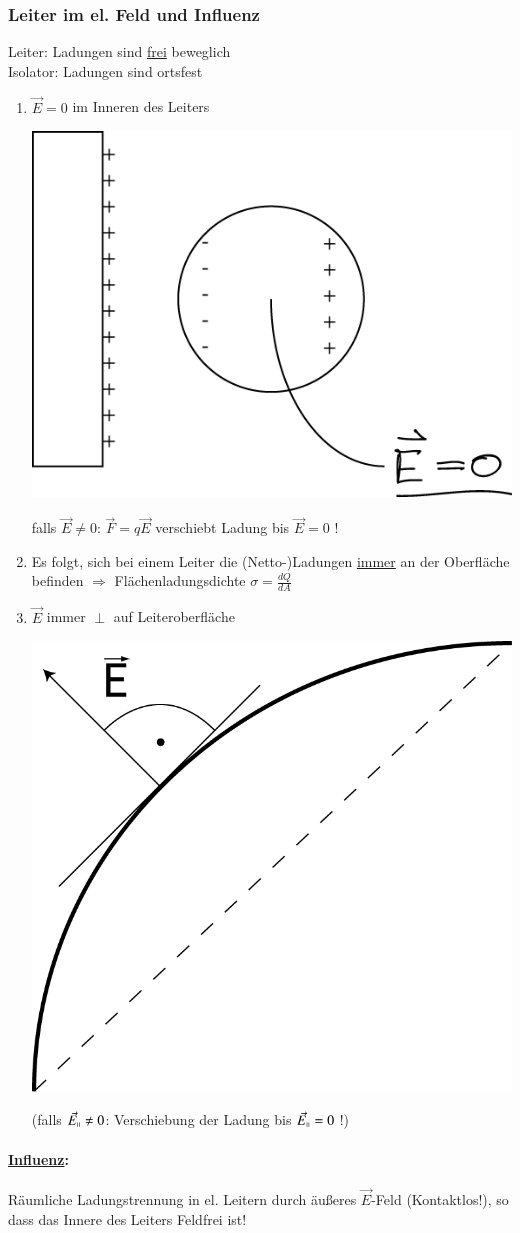 \documentclass[11pt]{article}
\begin{document}
	\subsubsection{Leiter im el. Feld und Influenz}
	Leiter: Ladungen sind \underline{frei} beweglich  \\
	Isolator: Ladungen sind ortsfest
	\begin{enumerate}
		\item $ \vec{E} = 0 $ im Inneren des Leiters 
		\begin{center}
			\includegraphics[width=0.4\linewidth]{skizzen/14/14_4B6}
		\end{center} 
		falls $ \vec{E} \neq 0 $: $ \vec{F} = q\vec{E} $ verschiebt Ladung bis $ \vec{E} = 0 $ ! 
		\item Es folgt, sich bei einem Leiter die (Netto-)Ladungen \underline{immer} an der Oberfläche befinden $ \Rightarrow $ Flächenladungsdichte $ \boxed{\sigma = \frac{dQ}{dA}} $
		\item $ \vec{E} $ immer $ \perp $ auf Leiteroberfläche
		\begin{center}
			\includegraphics[width=0.4\linewidth]{skizzen/14/14_4B7}
		\end{center}
		(falls $ \vec{E}_{\shortparallel} \neq 0 $: Verschiebung der Ladung bis $ \vec{E}_{\shortparallel} = 0 $ !)

	\end{enumerate}
	\paragraph{\underline{Influenz}:} Räumliche Ladungstrennung in el. Leitern durch äu\ss{}eres $ \vec{E} $-Feld (Kontaktlos!), so dass das Innere des Leiters Feldfrei ist! 
	
\end{document}
